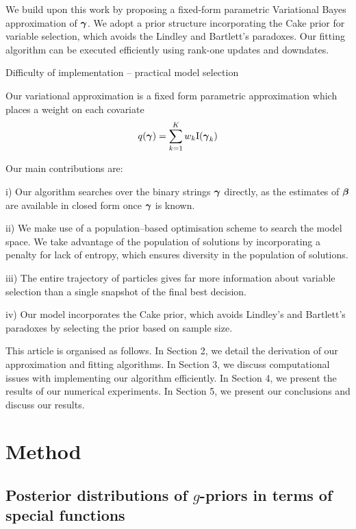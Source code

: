 \documentclass{amsart}[12pt]
\begin{document}
We build upon this work by proposing a fixed-form parametric Variational Bayes approximation of ${\boldsymbol \gamma}$.
We adopt a prior structure incorporating the Cake prior for variable selection, which avoids the Lindley
and Bartlett's paradoxes.
Our fitting algorithm can be executed efficiently using rank-one updates and downdates.

Difficulty of implementation -- practical model selection
\cite{Chipman2014}

Our variational approximation is a fixed form parametric approximation which places a weight on each covariate
\[
	q({\boldsymbol \gamma}) = \sum_{k=1}^K w_k \text{I}({\boldsymbol \gamma}_k)
\]


Our main contributions are:

i) Our algorithm searches over the binary strings ${\boldsymbol \gamma}$ directly, as the estimates of ${\boldsymbol \beta}$ are available 
in closed form once ${\boldsymbol \gamma}$ is known.

ii) We make use of a population--based optimisation scheme to search the model space. We take advantage of the
population of solutions by incorporating a penalty for lack of entropy, which ensures diversity in the
population of solutions.

iii) The entire trajectory of particles gives far more information about variable selection than a single
snapshot of the final best decision.

iv) Our model incorporates the Cake prior, which avoids Lindley's and Bartlett's paradoxes by selecting the
prior based on sample size.

This article is organised as follows. In Section 2, we detail the derivation of our approximation and fitting
algorithms. In Section 3, we discuss computational issues with implementing our algorithm efficiently. In
Section 4, we present the results of our numerical experiments. In Section 5, we present our conclusions and
discuss our results.

\section{Method}

\subsection{Posterior distributions of $g$-priors in terms of special functions}
\end{document}

